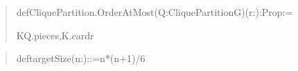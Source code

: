 \documentclass[spanish,11pt,a4paper]{article}
\newlength{\LeanCharWidth}
\begin{document}
\begin{quote}
\noindent \strut\par
\noindent def\hspace*{\dimexpr 1\LeanCharWidth\relax}CliquePartition.OrderAtMost\hspace*{\dimexpr 1\LeanCharWidth\relax}(Q\hspace*{\dimexpr 1\LeanCharWidth\relax}:\hspace*{\dimexpr 1\LeanCharWidth\relax}CliquePartition\hspace*{\dimexpr 1\LeanCharWidth\relax}G)\hspace*{\dimexpr 1\LeanCharWidth\relax}(r\hspace*{\dimexpr 1\LeanCharWidth\relax}:\hspace*{\dimexpr 1\LeanCharWidth\relax}{\LeanSymbols ℕ})\hspace*{\dimexpr 1\LeanCharWidth\relax}:\hspace*{\dimexpr 1\LeanCharWidth\relax}Prop\hspace*{\dimexpr 1\LeanCharWidth\relax}:=\par
\noindent \hspace*{\dimexpr 2\LeanCharWidth\relax}{\LeanSymbols ∀}\hspace*{\dimexpr 1\LeanCharWidth\relax}K\hspace*{\dimexpr 1\LeanCharWidth\relax}{\LeanSymbols ∈}\hspace*{\dimexpr 1\LeanCharWidth\relax}Q.pieces,\hspace*{\dimexpr 1\LeanCharWidth\relax}K.card\hspace*{\dimexpr 1\LeanCharWidth\relax}{\LeanSymbols ≤}\hspace*{\dimexpr 1\LeanCharWidth\relax}r\par
\end{quote}

\begin{quote}\fontsize{8.5}{10.2}\selectfont\ttfamily\raggedright\setlength{\parskip}{0pt}\settowidth{\LeanCharWidth}{0}
\noindent def\hspace*{\dimexpr 1\LeanCharWidth\relax}targetSize\hspace*{\dimexpr 1\LeanCharWidth\relax}(n\hspace*{\dimexpr 1\LeanCharWidth\relax}:\hspace*{\dimexpr 1\LeanCharWidth\relax}{\LeanSymbols ℕ})\hspace*{\dimexpr 1\LeanCharWidth\relax}:\hspace*{\dimexpr 1\LeanCharWidth\relax}{\LeanSymbols ℕ}\hspace*{\dimexpr 1\LeanCharWidth\relax}:=\hspace*{\dimexpr 1\LeanCharWidth\relax}n\hspace*{\dimexpr 1\LeanCharWidth\relax}*\hspace*{\dimexpr 1\LeanCharWidth\relax}(n\hspace*{\dimexpr 1\LeanCharWidth\relax}+\hspace*{\dimexpr 1\LeanCharWidth\relax}1)\hspace*{\dimexpr 1\LeanCharWidth\relax}/\hspace*{\dimexpr 1\LeanCharWidth\relax}6\par
\end{quote}
\end{document}
